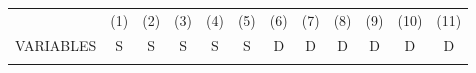 \documentclass[]{article}
\begin{document}
\begin{center}
    \begin{tabular}{lccccccccccc} \hline
                         & (1)                                            & (2)                                            & (3)                                            & (4)                                            & (5)                                            & (6)                                             & (7)                                             & (8)                                            & (9)                                            & (10)                                           & (11)                                           \\
        VARIABLES        & S                                              & S                                              & S                                              & S                                              & S                                              & D                                               & D                                               & D                                              & D                                              & D                                              & D                                              \\ \hline
        \vspace{4pt}     & \begin{footnotesize}\end{footnotesize}         & \begin{footnotesize}\end{footnotesize}         & \begin{footnotesize}\end{footnotesize}         & \begin{footnotesize}\end{footnotesize}         & \begin{footnotesize}\end{footnotesize}         & \begin{footnotesize}\end{footnotesize}          & \begin{footnotesize}\end{footnotesize}          & \begin{footnotesize}\end{footnotesize}         & \begin{footnotesize}\end{footnotesize}         & \begin{footnotesize}\end{footnotesize}         & \begin{footnotesize}\end{footnotesize}         \\

\end{tabular}
\end{center}
\end{document}
